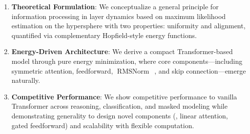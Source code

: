 \begin{enumerate}[leftmargin=*]
\item \textbf{Theoretical Formulation}: We conceptualize a general principle for information processing in layer dynamics based on maximum likelihood estimation on the hypersphere with two properties: uniformity and alignment, quantified via complementary Hopfield-style energy functions.
\item \textbf{Energy-Driven Architecture}: We derive a compact Transformer-based model through pure energy minimization, where core components—including symmetric attention, feedforward, $\operatorname{RMSNorm}$~\citep{zhang2019root}, and skip connection—emerge naturally.
\item \textbf{Competitive Performance}: We show competitive performance to vanilla Transformer across reasoning, classification, and masked modeling while demonstrating generality to design novel components (\eg, linear attention, gated feedforward) and scalability with flexible computation.
\end{enumerate}
